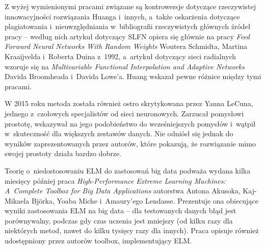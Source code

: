 \documentclass[pl]{minipw} %
\begin{document}
Z wyżej wymienionymi pracami związane są kontrowersje dotyczące rzeczywistej innowacyjności rozwiązania Huanga i~innych, a~także oskarżenia dotyczące plagiatowania i~nieuwzględniania w~bibliografii rzeczywistych głównych źródeł pracy -- według nich artykuł dotyczący SLFN opiera się głównie na pracy \textit{Feed Forward Neural Networks With Random Weights} Woutera Schmidta, Martina Kraaijvelda i~Roberta Duina z~1992, a~artykuł dotyczący sieci radialnych wzoruje się na \textit{Multivariable Functional Interpolation and Adaptive Networks} Davida Broomheada i~Davida Lowe'a. Huang wskazał pewne różnice między tymi pracami.

W 2015 roku metoda została również ostro skrytykowana przez Yanna LeCuna, jednego z~czołowych specjalistów od sieci neuronowych. Zarzucał pomysłowi prostotę, wskazywał na jego podobieństwo do wcześniejszych pomysłów i~wątpił w~skuteczność dla większych zestawów danych. Nie odniósł się jednak do wyników zaprezentowanych przez autorów, które pokazują, że rozwiązanie mimo swojej prostoty działa bardzo dobrze.

Teorię o~niedostosowaniu ELM do zastosowań big data podważa wydana kilka miesięcy później praca \textit{High-Performance Extreme Learning Machines: A~Complete Toolbox for Big Data Applications} autorstwa Antona Akusoka, Kaj-Mikaela Bj\"orka, Yoaba Miche i~Amaury'ego Lendasse. Prezentuje ona obiecujące wyniki zastosowania ELM na big data -- dla testowanych danych błąd jest porównywalny, podczas gdy czas uczenia jest mniejszy (od kilku razy dla niektórych metod, nawet do kilku tysięcy razy dla innych). Praca opisuje również udostępniony przez autorów toolbox, implementujący ELM.
\end{document}

